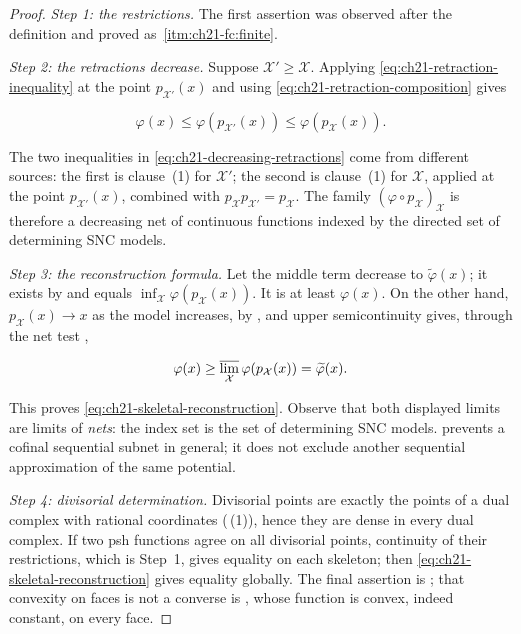 \begin{proof}
\emph{Step 1: the restrictions.}
The first assertion was observed after the definition and proved as
\,\cref{itm:ch21-fc:finite}.

\emph{Step 2: the retractions decrease.}
Suppose
$\mathcal X'\geq\mathcal X$.  Applying
\eqref{eq:ch21-retraction-inequality} at the point
$p_{\mathcal X'}(x)$ and using
\eqref{eq:ch21-retraction-composition} gives

\begin{equation}
\label{eq:ch21-decreasing-retractions}
 \varphi(x)
 \leq\varphi(p_{\mathcal X'}(x))
 \leq\varphi(p_{\mathcal X}(x)).
\end{equation}

The two inequalities in \eqref{eq:ch21-decreasing-retractions} come from
different sources: the first is clause~(1) for $\mathcal X'$; the second is
clause~(1) for $\mathcal X$, applied at the point
$p_{\mathcal X'}(x)$, combined with
$p_{\mathcal X}p_{\mathcal X'}=p_{\mathcal X}$.  The family
$(\varphi\circ p_{\mathcal X})_{\mathcal X}$ is therefore a decreasing net
of continuous functions indexed by the directed set of determining SNC
models.

\emph{Step 3: the reconstruction formula.}
Let the middle term decrease to $\widetilde\varphi(x)$; it exists by
 and equals
$\inf_{\mathcal X}\varphi(p_{\mathcal X}(x))$.  It is at least
$\varphi(x)$.  On the other hand, $p_{\mathcal X}(x)\to x$ as
the model increases, by , and upper
semicontinuity gives, through the net test
,

\[
 \varphi(x)\geq
 \varlimsup_{\mathcal X}\varphi(p_{\mathcal X}(x))
 =\widetilde\varphi(x).
\]

This proves \eqref{eq:ch21-skeletal-reconstruction}.  Observe that both
displayed limits are limits of \emph{nets}: the index set is the set of
determining SNC models.   prevents
a cofinal sequential subnet in general; it does not exclude another
sequential approximation of the same potential.

\emph{Step 4: divisorial determination.}
Divisorial points are exactly the points of a dual complex with rational
coordinates (\,(1)), hence they are
dense in every dual complex.
If two psh functions agree on all divisorial points, continuity of their
restrictions, which is Step~1, gives
equality on each skeleton; then
\eqref{eq:ch21-skeletal-reconstruction} gives equality globally.  The final
assertion is ; that convexity on faces
is not a converse is , whose function is
convex, indeed constant, on every face.
\end{proof}

